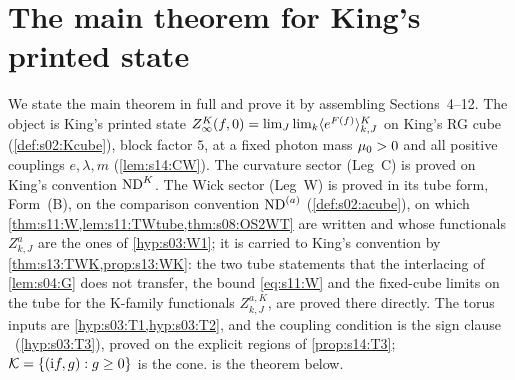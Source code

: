 \section{The main theorem for King's printed state}

We state the main theorem in full and prove it by assembling Sections~4--12. The object is King's printed state $Z^{K}_{\infty}(f,0)=\lim_J\lim_k\langle e^{F(f)}\rangle^{K}_{k,J}$ on King's RG cube (\cref{def:s02:Kcube}), block factor $5$, at a fixed photon mass $\mu_0>0$ and all positive couplings $e,\lambda,m$ (\cref{lem:s14:CW}). The curvature sector (Leg~C) is proved on King's convention $\mathrm{ND}^{K}$. The Wick sector (Leg~W) is proved in its tube form, Form~(B), on the comparison convention $\mathrm{ND}^{(a)}$ (\cref{def:s02:acube}), on which \cref{thm:s11:W,lem:s11:TWtube,thm:s08:OS2WT} are written and whose functionals $Z^a_{k,J}$ are the ones of \cref{hyp:s03:W1}; it is carried to King's convention by \cref{thm:s13:TWK,prop:s13:WK}: the two tube statements that the interlacing of \cref{lem:s04:G} does not transfer, the bound \eqref{eq:s11:W} and the fixed-cube limits on the tube for the K-family functionals $Z^{a,K}_{k,J}$, are proved there directly. The torus inputs are \cref{hyp:s03:T1,hyp:s03:T2}, and the coupling condition is the sign clause \Tthree\ (\cref{hyp:s03:T3}), proved on the explicit regions of \cref{prop:s14:T3}; $\mathcal K=\{(\mathrm if,g):g\ge0\}$ is the cone.  is the theorem below.

